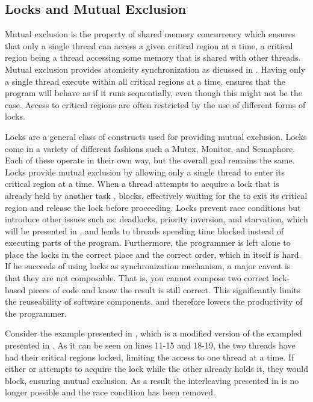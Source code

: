 \subsection{Locks and Mutual Exclusion}\label{sec:locks_me}
Mutual exclusion is the property of shared memory concurrency which ensures that only a single thread can access a given critical region at a time\cite[p. 117]{tanenbaum2008modern}\cite[p. 962]{bryant2011computer}, a critical region being a thread accessing some memory that is shared with other threads\cite[p. 117]{tanenbaum2008modern}\cite[p. 961]{bryant2011computer}. Mutual exclusion provides atomicity synchronization as dicussed in . Having only a single thread execute within all critical regions at a time, ensures that the program will behave as if it runs sequentially, even though this might not be the case. Access to critical regions are often restricted by the use of different forms of locks\cite[p. 58]{sutter2005software}. 

Locks are a general class of constructs used for providing mutual exclusion. Locks come in a variety of different fashions such a Mutex, Monitor, and Semaphore. Each of these operate in their own way, but the overall goal remains the same. Locks provide mutual exclusion by allowing only a single thread to enter its critical region at a time. When a thread  attempts to acquire a lock that is already held by another task , blocks, effectively waiting for the  to exit its critical region and release the lock before proceeding. Locks prevent race conditions but introduce other issues such as: deadlocks, priority inversion, and starvation, which will be presented in , and leads to threads spending time blocked instead of executing parts of the program. Furthermore, the programmer is left alone to place the locks in the correct place and the correct order, which in itself is hard. If he succeeds of using locks as synchronization mechanism, a major caveat is that they are not composable\cite[p. 58]{sutter2005software}. That is, you cannot compose two correct lock-based pieces of code and know the result is still correct. This significantly limits the reuseability of software components, and therefore lowers the productivity of the programmer.

Consider the example presented in , which is a modified version of the exampled presented in . As it can be seen on lines 11-15 and 18-19, the two threads have had their critical regions locked, limiting the access to one thread at a time. If either  or  attempts to acquire the lock while the other already holds it, they would block, ensuring mutual exclusion. As a result the interleaving presented in  is no longer possible and the race condition has been removed. 

